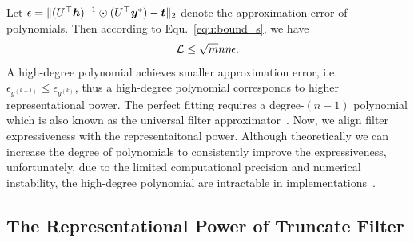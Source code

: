 \documentclass{article} %
\def\valpha{{\bm\alpha}}
\def\vlambda{{\bm\lambda}}
\newtheorem{proposition}{\textbf{Proposition}} %
\begin{document}
Let $\epsilon=\|(U^{\top}{\bm{h}})^{-1}\odot(U^{\top}{\bm{y}}^*)-{\bm{t}}\|_2$ denote the approximation error of polynomials.
Then according to Equ.~\ref{equ:bound_s}, we have
\begin{equation}
	\label{equ:bound_poly}
	\begin{aligned}
		{\mathcal{L}}\leq\sqrt{m}n\eta\epsilon.
	\end{aligned}
\end{equation}
A high-degree polynomial achieves smaller approximation error, i.e. $\epsilon_{g^{(k+1)}}\leq\epsilon_{g^{(k)}}$, thus a high-degree polynomial corresponds to higher representational power.
The perfect fitting requires a degree-$(n-1)$ polynomial which is also known as the universal filter approximator~\citep{he2021bernnet,yang2022spectrum,JacobiConv,bo2022specformer}.
Now, we align filter expressiveness with the representaitonal power.
Although theoretically we can increase the degree of polynomials to consistently improve the expressiveness, unfortunately, due to the limited computational precision and numerical instability, the high-degree polynomial are intractable in implementations~\citep{yang2022spectrum}.


\subsection{The Representational Power of Truncate Filter}
\end{document}
